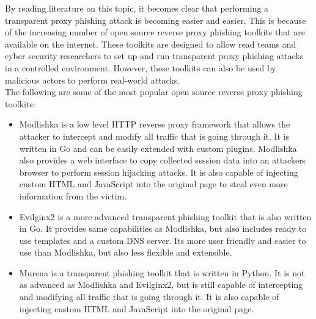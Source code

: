\documentclass[12pt]{scrbook}
\begin{document}
By reading literature on this topic, it becomes clear that 
performing a transparent proxy phishing attack is
becoming easier and easier. This is because of the increasing number of open
source reverse proxy phishing toolkits that are available on the internet. These
toolkits are designed to allow read teams and cyber security researchers to set
up and run transparent proxy phishing attacks in a controlled environment.
However, these toolkits can also be used by malicious actors to perform
real-world attacks.\\The following are some of the most popular open source
reverse proxy phishing toolkits:
\begin{itemize}
  \item Modlishka \cite{modlishka} is a low level HTTP reverse proxy framework that allows the
    attacker to intercept and modify all traffic that is going through it. It is
    written in Go and can be easily extended with custom plugins. Modlishka also
    provides a web interface to copy collected session data into an attackers
    browser to perform session hijacking attacks. It is also capable of injecting
    custom HTML and JavaScript into the original page to steal even more
    information from the victim.
  \item Evilginx2 \cite{evilginx2} is a more advanced transparent phishing
    toolkit that is also written in Go. It provides same capabilities as
    Modlishka, but also includes ready to use templates and a custom DNS server.
    Its more user friendly and easier to use than Modlishka, but also less
    flexible and extensible.
  \item Murena \cite{murena} is a transparent phishing toolkit that is written
    in Python. It is not as advanced as Modlishka and Evilginx2, but is still
    capable of intercepting and modifying all traffic that is going through it.
    It is also capable of injecting custom HTML and JavaScript into the original
    page.
\end{itemize}
\end{document}
